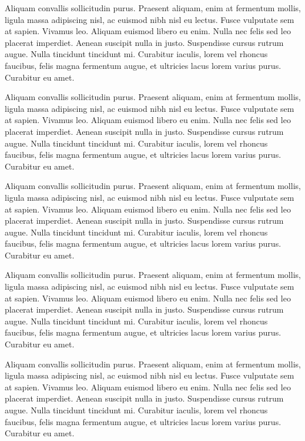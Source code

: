 \documentclass[twoside]{report}
\begin{document}
Aliquam convallis sollicitudin purus. Praesent aliquam, enim at fermentum mollis, ligula massa adipiscing nisl, ac euismod nibh nisl eu lectus. Fusce vulputate sem at sapien. Vivamus leo. Aliquam euismod libero eu enim. Nulla nec felis sed leo placerat imperdiet. Aenean suscipit nulla in justo. Suspendisse cursus rutrum augue. Nulla tincidunt tincidunt mi. Curabitur iaculis, lorem vel rhoncus faucibus, felis magna fermentum augue, et ultricies lacus lorem varius purus. Curabitur eu amet.

Aliquam convallis sollicitudin purus. Praesent aliquam, enim at fermentum mollis, ligula massa adipiscing nisl, ac euismod nibh nisl eu lectus. Fusce vulputate sem at sapien. Vivamus leo. Aliquam euismod libero eu enim. Nulla nec felis sed leo placerat imperdiet. Aenean suscipit nulla in justo. Suspendisse cursus rutrum augue. Nulla tincidunt tincidunt mi. Curabitur iaculis, lorem vel rhoncus faucibus, felis magna fermentum augue, et ultricies lacus lorem varius purus. Curabitur eu amet.

Aliquam convallis sollicitudin purus. Praesent aliquam, enim at fermentum mollis, ligula massa adipiscing nisl, ac euismod nibh nisl eu lectus. Fusce vulputate sem at sapien. Vivamus leo. Aliquam euismod libero eu enim. Nulla nec felis sed leo placerat imperdiet. Aenean suscipit nulla in justo. Suspendisse cursus rutrum augue. Nulla tincidunt tincidunt mi. Curabitur iaculis, lorem vel rhoncus faucibus, felis magna fermentum augue, et ultricies lacus lorem varius purus. Curabitur eu amet.

Aliquam convallis sollicitudin purus. Praesent aliquam, enim at fermentum mollis, ligula massa adipiscing nisl, ac euismod nibh nisl eu lectus. Fusce vulputate sem at sapien. Vivamus leo. Aliquam euismod libero eu enim. Nulla nec felis sed leo placerat imperdiet. Aenean suscipit nulla in justo. Suspendisse cursus rutrum augue. Nulla tincidunt tincidunt mi. Curabitur iaculis, lorem vel rhoncus faucibus, felis magna fermentum augue, et ultricies lacus lorem varius purus. Curabitur eu amet.

Aliquam convallis sollicitudin purus. Praesent aliquam, enim at fermentum mollis, ligula massa adipiscing nisl, ac euismod nibh nisl eu lectus. Fusce vulputate sem at sapien. Vivamus leo. Aliquam euismod libero eu enim. Nulla nec felis sed leo placerat imperdiet. Aenean suscipit nulla in justo. Suspendisse cursus rutrum augue. Nulla tincidunt tincidunt mi. Curabitur iaculis, lorem vel rhoncus faucibus, felis magna fermentum augue, et ultricies lacus lorem varius purus. Curabitur eu amet.
\end{document}

